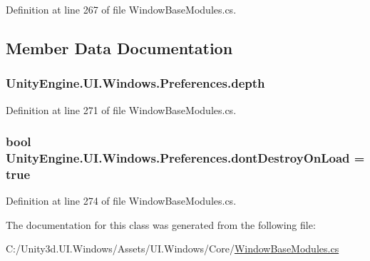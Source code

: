 Definition at line 267 of file Window\+Base\+Modules.\+cs.



\subsection{Member Data Documentation}
\hypertarget{class_unity_engine_1_1_u_i_1_1_windows_1_1_preferences_a83c733583d69da70ba6880aaf32a07de}{}
\subsubsection[{depth}]{ Unity\+Engine.\+U\+I.\+Windows.\+Preferences.\+depth}\label{class_unity_engine_1_1_u_i_1_1_windows_1_1_preferences_a83c733583d69da70ba6880aaf32a07de}


Definition at line 271 of file Window\+Base\+Modules.\+cs.

\hypertarget{class_unity_engine_1_1_u_i_1_1_windows_1_1_preferences_ab726c2b284de2083367736ed13b1a135}{}
\subsubsection[{dont\+Destroy\+On\+Load}]{\setlength{\rightskip}{0pt plus 5cm}bool Unity\+Engine.\+U\+I.\+Windows.\+Preferences.\+dont\+Destroy\+On\+Load = true}\label{class_unity_engine_1_1_u_i_1_1_windows_1_1_preferences_ab726c2b284de2083367736ed13b1a135}


Definition at line 274 of file Window\+Base\+Modules.\+cs.



The documentation for this class was generated from the following file\+:\begin{DoxyCompactItemize}
\item 
C\+:/\+Unity3d.\+U\+I.\+Windows/\+Assets/\+U\+I.\+Windows/\+Core/\hyperlink{_window_base_modules_8cs}{Window\+Base\+Modules.\+cs}\end{DoxyCompactItemize}
